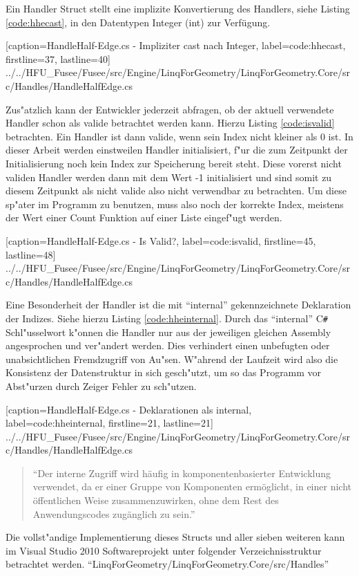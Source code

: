 \documentclass[pagesize, paper=a4, fontsize=12pt,titlepage=true, headings=small, headnosepline, abstractoff, liststotoc, nochapterprefix, plainheadsepline]{scrreprt}
\newcommand{\CSS}{C\texttt{\# }}
\begin{document}
Ein Handler Struct stellt eine implizite Konvertierung des Handlers, siehe Listing \ref{code:hhecast}, in den Datentypen Integer (int) zur Verfügung.

			[caption={HandleHalf-Edge.cs - Impliziter cast nach Integer}, label=code:hhecast, firstline=37, lastline=40]
			{../../HFU_Fusee/Fusee/src/Engine/LinqForGeometry/LinqForGeometry.Core/src/Handles/HandleHalfEdge.cs}

Zus"atzlich kann der Entwickler jederzeit abfragen, ob der aktuell verwendete Handler schon als valide betrachtet werden kann. Hierzu Listing \ref{code:isvalid} betrachten. Ein Handler ist dann valide, wenn sein Index nicht kleiner als 0 ist. In dieser Arbeit werden einstweilen Handler initialisiert, f"ur die zum Zeitpunkt der Initialisierung noch kein Index zur Speicherung bereit steht. Diese vorerst nicht validen Handler werden dann mit dem Wert -1 initialisiert und sind somit zu diesem Zeitpunkt als nicht valide also nicht verwendbar zu betrachten. Um diese sp"ater im Programm zu benutzen, muss also noch der korrekte Index, meistens der Wert einer Count Funktion auf einer Liste eingef"ugt werden.

			[caption={HandleHalf-Edge.cs - Is Valid?}, label=code:isvalid, firstline=45, lastline=48]
			{../../HFU_Fusee/Fusee/src/Engine/LinqForGeometry/LinqForGeometry.Core/src/Handles/HandleHalfEdge.cs}

Eine Besonderheit der Handler ist die mit "`internal"' gekennzeichnete Deklaration der Indizes. Siehe hierzu Listing \ref{code:hheinternal}. Durch das "`internal"' \CSS Schl"usselwort k"onnen die Handler nur aus der jeweiligen gleichen Assembly angesprochen und ver"andert werden. Dies verhindert einen unbefugten oder unabsichtlichen Fremdzugriff von Au"sen. W"ahrend der Laufzeit wird also die Konsistenz der Datenstruktur in sich gesch"utzt, um so das Programm vor Abst"urzen durch Zeiger Fehler zu sch"utzen.

			[caption={HandleHalf-Edge.cs - Deklarationen als internal}, label=code:hheinternal, firstline=21, lastline=21]
			{../../HFU_Fusee/Fusee/src/Engine/LinqForGeometry/LinqForGeometry.Core/src/Handles/HandleHalfEdge.cs}
\newpage
\begin{quote}"`Der interne Zugriff wird h{\"a}ufig in komponentenbasierter Entwicklung verwendet, da er einer Gruppe von Komponenten erm{\"o}glicht, in einer nicht {\"o}ffentlichen Weise zusammenzuwirken, ohne dem Rest des Anwendungscodes zug{\"a}nglich zu sein."' \cite{MicrosoftCReferenz.2013}\end{quote}


Die vollst"andige Implementierung dieses Structs und aller sieben weiteren kann im Visual Studio 2010 Softwareprojekt unter folgender Verzeichnisstruktur betrachtet werden. "`LinqForGeometry/LinqForGeometry.Core/src/Handles"'
\end{document}
